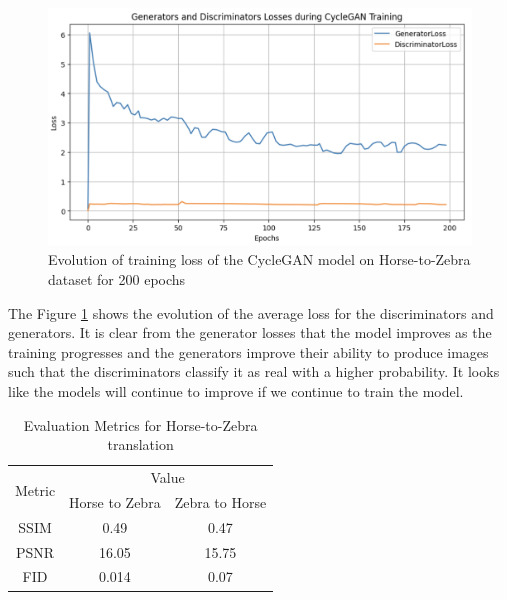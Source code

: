 \documentclass[UKenglish,12pt]{master-style}
\begin{document}
\begin{figure}[htbp]
    \centering
    \includegraphics[width=1\textwidth]{Images/Training_Loss_H2Z.png}
    \caption{Evolution of training loss of the CycleGAN model on Horse-to-Zebra dataset for 200 epochs}
    \label{fig:Training_Loss_H2Z}
\end{figure}

The Figure \ref{fig:Training_Loss_H2Z} shows the evolution of the average loss for the discriminators and generators.  It is clear from the generator losses that the model improves as the training progresses and the generators improve their ability to produce images such that the discriminators classify it as real with a higher probability. It looks like the models will continue to improve if we continue to train the model. 

\begin{table}[htbp]
  \centering
  \caption{Evaluation Metrics for Horse-to-Zebra translation}
  \label{tab:evaluation_H2Z}
  \begin{tabular}{|c|c|c|}
    \hline
    \multirow{2}{*}{Metric} & \multicolumn{2}{c|}{Value} \\ \cline{2-3} 
     & Horse to Zebra & Zebra to Horse \\ \hline
    SSIM & 0.49 & 0.47 \\ \hline
    PSNR & 16.05 & 15.75 \\ \hline
    FID & 0.014 & 0.07 \\ \hline
  \end{tabular}
\end{table}
\end{document}
